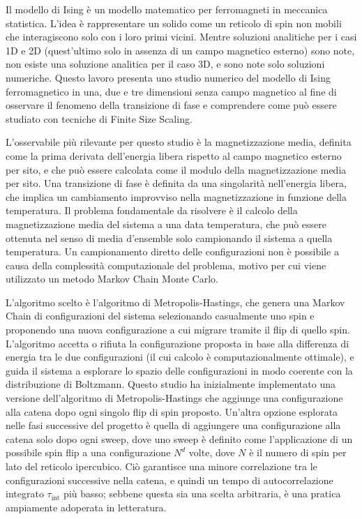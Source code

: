 \documentclass[11pt,a4paper]{article}
\begin{document}
Il modello di Ising è un modello matematico per ferromagneti in meccanica statistica. L'idea è rappresentare un solido come un reticolo di spin non mobili che interagiscono solo con i loro primi vicini. Mentre soluzioni analitiche per i casi 1D e 2D (quest'ultimo solo in assenza di un campo magnetico esterno) sono note, non esiste una soluzione analitica per il caso 3D, e sono note solo soluzioni numeriche. Questo lavoro presenta uno studio numerico del modello di Ising ferromagnetico in una, due e tre dimensioni senza campo magnetico al fine di osservare il fenomeno della transizione di fase e comprendere come può essere studiato con tecniche di Finite Size Scaling.

L'osservabile più rilevante per questo studio è la magnetizzazione media, definita come la prima derivata dell'energia libera rispetto al campo magnetico esterno per sito, e che può essere calcolata come il modulo della magnetizzazione media per sito. Una transizione di fase è definita da una singolarità nell'energia libera, che implica un cambiamento improvviso nella magnetizzazione in funzione della temperatura. Il problema fondamentale da risolvere è il calcolo della magnetizzazione media del sistema a una data temperatura, che può essere ottenuta nel senso di media d'ensemble solo campionando il sistema a quella temperatura. Un campionamento diretto delle configurazioni non è possibile a causa della complessità computazionale del problema, motivo per cui viene utilizzato un metodo Markov Chain Monte Carlo.

L'algoritmo scelto è l'algoritmo di Metropolis-Hastings, che genera una Markov Chain di configurazioni del sistema selezionando casualmente uno spin e proponendo una nuova configurazione a cui migrare tramite il flip di quello spin. L'algoritmo accetta o rifiuta la configurazione proposta in base alla differenza di energia tra le due configurazioni (il cui calcolo è computazionalmente ottimale), e guida il sistema a esplorare lo spazio delle configurazioni in modo coerente con la distribuzione di Boltzmann. Questo studio ha inizialmente implementato una versione dell'algoritmo di Metropolis-Hastings che aggiunge una configurazione alla catena dopo ogni singolo flip di spin proposto. Un'altra opzione esplorata nelle fasi successive del progetto è quella di aggiungere una configurazione alla catena solo dopo ogni sweep, dove uno sweep è definito come l'applicazione di un possibile spin flip a una configurazione $N^d$ volte, dove $N$ è il numero di spin per lato del reticolo ipercubico. Ciò garantisce una minore correlazione tra le configurazioni successive nella catena, e quindi un tempo di autocorrelazione integrato $\tau_{\text{int}}$ più basso; sebbene questa sia una scelta arbitraria, è una pratica ampiamente adoperata in letteratura.
\end{document}
